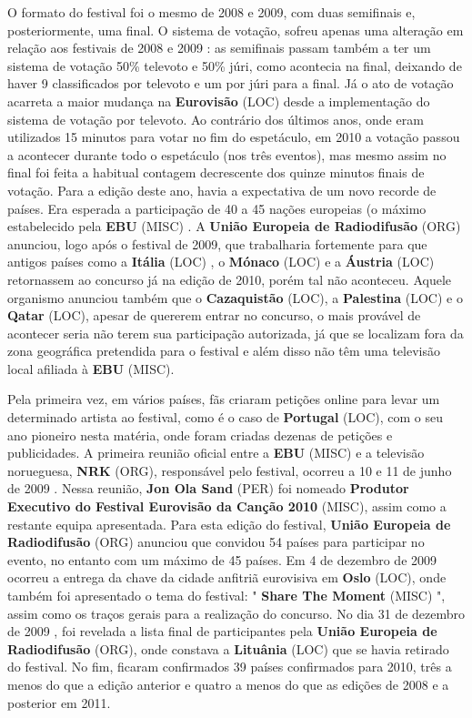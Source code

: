 \documentclass[12pt,a4paper]{article}
\begin{document}
O formato do festival foi o mesmo de 2008 e 2009, com duas semifinais e, posteriormente, uma final. O sistema de votação, sofreu apenas uma alteração em relação aos festivais de 2008 e 2009 : as semifinais passam também a ter um sistema de votação 50\% televoto e 50\% júri, como acontecia na final, deixando de haver 9 classificados por televoto e um por júri para a final. Já o ato de votação acarreta a maior mudança na \textbf{Eurovisão} (LOC) desde a implementação do sistema de votação por televoto. Ao contrário dos últimos anos, onde eram utilizados 15 minutos para votar no fim do espetáculo, em 2010 a votação passou a acontecer durante todo o espetáculo (nos três eventos), mas mesmo assim no final foi feita a habitual contagem decrescente dos quinze minutos finais de votação. Para a edição deste ano, havia a expectativa de um novo recorde de países. Era esperada a participação de 40 a 45 nações europeias (o máximo estabelecido pela \textbf{EBU} (MISC) . A \textbf{União Europeia de Radiodifusão} (ORG) anunciou, logo após o festival de 2009, que trabalharia fortemente para que antigos países como a \textbf{Itália} (LOC) , o \textbf{Mónaco} (LOC) e a \textbf{Áustria} (LOC) retornassem ao concurso já na edição de 2010, porém tal não aconteceu. Aquele organismo anunciou também que o \textbf{Cazaquistão} (LOC), a \textbf{Palestina} (LOC) e o \textbf{Qatar} (LOC), apesar de quererem entrar no concurso, o mais provável de acontecer seria não terem sua participação autorizada, já que se localizam fora da zona geográfica pretendida para o festival e além disso não têm uma televisão local afiliada à \textbf{EBU} (MISC).

Pela primeira vez, em vários países, fãs criaram petições online para levar um determinado artista ao festival, como é o caso de \textbf{Portugal} (LOC), com o seu ano pioneiro nesta matéria, onde foram criadas dezenas de petições e publicidades. A primeira reunião oficial entre a \textbf{EBU} (MISC) e a televisão norueguesa, \textbf{NRK} (ORG), responsável pelo festival, ocorreu a 10 e 11 de junho de 2009 . Nessa reunião, \textbf{Jon Ola Sand} (PER) foi nomeado \textbf{Produtor Executivo do Festival Eurovisão da Canção 2010} (MISC), assim como a restante equipa apresentada. Para esta edição do festival, \textbf{União Europeia de Radiodifusão} (ORG) anunciou que convidou 54 países para participar no evento, no entanto com um máximo de 45 países. Em 4 de dezembro de 2009 ocorreu a entrega da chave da cidade anfitriã eurovisiva em \textbf{Oslo} (LOC), onde também foi apresentado o tema do festival: " \textbf{Share The Moment} (MISC) ", assim como os traços gerais para a realização do concurso. No dia 31 de dezembro de 2009 , foi revelada a lista final de participantes pela \textbf{União Europeia de Radiodifusão} (ORG), onde constava a \textbf{Lituânia} (LOC) que se havia retirado do festival. No fim, ficaram confirmados 39 países confirmados para 2010, três a menos do que a edição anterior e quatro a menos do que as edições de 2008 e a posterior em 2011.
\end{document}
